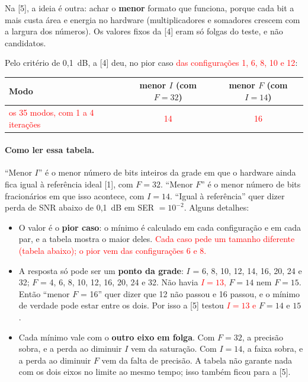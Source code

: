 \documentclass[11pt]{article}
\newcommand{\novo}[1]{\textcolor{red}{#1}}
\begin{document}
Na [5], a ideia é outra: achar o \textbf{menor} formato que funciona, porque cada bit a mais custa
área e energia no hardware (multiplicadores e somadores crescem com a largura dos números). Os
valores fixos da [4] eram só folgas do teste, e não candidatos.

Pelo critério de 0,1~dB, a [4] deu, no pior caso \novo{das configurações 1, 6, 8, 10 e 12}:
\begin{center}
\small
\renewcommand{\arraystretch}{1.15}
\begin{tabular}{|l|c|c|}
\hline
Modo & menor $I$ (com $F = 32$) & menor $F$ (com $I = 14$) \\
\hline
\novo{os 35 modos, com 1 a 4 iterações} & \novo{14} & \novo{16} \\
\hline
\end{tabular}
\end{center}
\paragraph{Como ler essa tabela.} ``Menor $I$'' é o menor número de bits inteiros da grade em que o
hardware ainda fica igual à referência ideal [1], com $F = 32$. ``Menor $F$'' é o menor número de
bits fracionários em que isso acontece, com $I = 14$. ``Igual à referência'' quer dizer perda de
SNR abaixo de 0,1~dB em SER $= 10^{-2}$. Alguns detalhes:
\begin{itemize}
  \item O valor é o \textbf{pior caso}: o mínimo é calculado em cada configuração e em
        cada par, e a tabela mostra o maior deles. \novo{Cada caso pede um tamanho diferente
        (tabela abaixo); o pior vem das configurações 6 e 8.}
  \item A resposta só pode ser um \textbf{ponto da grade}: $I$ = 6, 8, 10, 12, 14, 16, 20, 24 e 32;
        $F$ = 4, 6, 8, 10, 12, 16, 20, 24 e 32. Não havia \novo{$I = 13$,} $F = 14$ nem $F = 15$. Então
        ``menor $F$ = 16'' quer dizer que 12 não passou e 16 passou, e o mínimo de verdade pode
        estar entre os dois. Por isso a [5] testou \novo{$I = 13$ e} $F = 14$ e $15$.
  \item Cada mínimo vale com o \textbf{outro eixo em folga}. Com $F = 32$, a precisão sobra, e a
        perda ao diminuir $I$ vem da saturação. Com $I = 14$, a faixa sobra, e a perda ao
        diminuir $F$ vem da falta de precisão. A tabela não garante nada com os dois eixos no
        limite ao mesmo tempo; isso também ficou para a [5].
\end{itemize}
\end{document}
